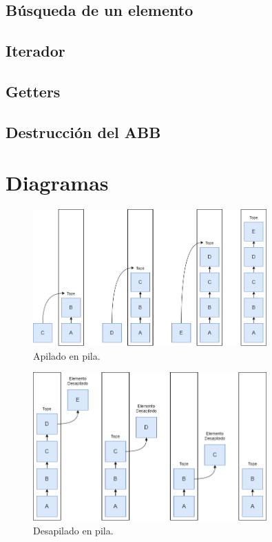 \documentclass[titlepage,a4paper]{article}
\begin{document}
											\subsection{Búsqueda de un elemento}




											\subsection{Iterador}




											\subsection{Getters}




											\subsection{Destrucción del ABB}



\section{Diagramas}\label{sec:diagramas}

\begin{figure}[H]
\centering
\includegraphics[width=0.8\textwidth]{pila_apilado.png}
\caption{\label{fig:seq01}Apilado en pila.}
\end{figure}


\begin{figure}[H]
\centering
\includegraphics[width=0.8\textwidth]{pila_desapilado.png}
\caption{\label{fig:seq02}Desapilado en pila.}
\end{figure}
\end{document}
